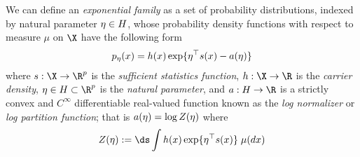 \begin{definition}
We can define an \textit{exponential family} as a set of probability distributions, indexed by natural parameter $\eta \in H$,%
 whose probability density functions with respect to measure $\mu$ on $\X$ have the following form
\begin{align}
 p_\eta(x) = h(x) \exp \{ \eta^\top s(x) - a(\eta)\} 
\label{eqn:exponential_family_natural}
 \end{align}
where $\sufficientStatsFunction  : \X \to \R^p$ is the \textit{sufficient statistics function}, $\carrierDensity : \X \to \R$ is the \textit{carrier density}, $\eta \in \naturalParamSpace \subset \R^p$ is the \textit{natural parameter},  and $\logNormalizerFunction : \naturalParamSpace \to \R$ is a strictly convex and $C^{\infty}$ differentiable real-valued function known as the \textit{log normalizer} or \textit{log partition function};  that is $a(\eta) = \log Z(\eta)$ where 
\begin{equation}
\label{eqn:partition_function}
 \normalizerFunction(\eta) := \ds\int  \carrierDensity(x) \exp \{ \eta^\top \sufficientStatsFunction(x)  \} \; \mu(dx)	
\end{equation}



\end{definition}
